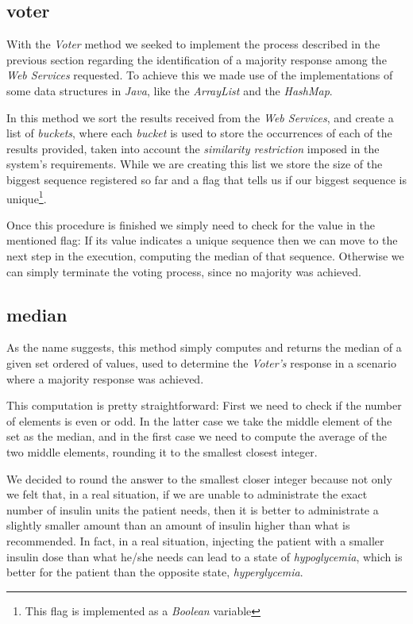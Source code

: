 \subsection{voter}

With the \emph{Voter} method we seeked to implement the process described in the previous section regarding the identification of a majority response among the \emph{Web Services} requested. To achieve this we made use of the implementations of some data structures in \emph{Java}, like the \emph{ArrayList} and the \emph{HashMap}.

In this method we sort the results received from the \emph{Web Services}, and create a list of \emph{buckets}, where each \emph{bucket} is used to store the occurrences of each of the results provided, taken into account the \emph{similarity restriction} imposed in the system's requirements. While we are creating this list we store the size of the biggest sequence registered so far and a flag that tells us if our biggest sequence is unique\footnote{This flag is implemented as a \emph{Boolean} variable}.

Once this procedure is finished we simply need to check for the value in the mentioned flag: If its value indicates a unique sequence then we can move to the next step in the execution, computing the median of that sequence. Otherwise we can simply terminate the voting process, since no majority was achieved.

\subsection{median}

As the name suggests, this method simply computes and returns the median of a given set ordered of values, used to determine the \emph{Voter's} response in a scenario where a majority response was achieved.

This computation is pretty straightforward: First we need to check if the number of elements is even or odd. In the latter case we take the middle element of the set as the median, and in the first case we need to compute the average of the two middle elements, rounding it to the smallest closest integer.

We decided to round the answer to the smallest closer integer because not only we felt that, in a real situation, if we are unable to administrate the exact number of insulin units the patient needs, then it is better to administrate a slightly smaller amount than an amount of insulin higher than what is recommended. In fact, in a real situation, injecting the patient with a smaller insulin dose than what he/she needs can lead to a state of \emph{hypoglycemia}, which is better for the patient than the opposite state, \emph{hyperglycemia}.

